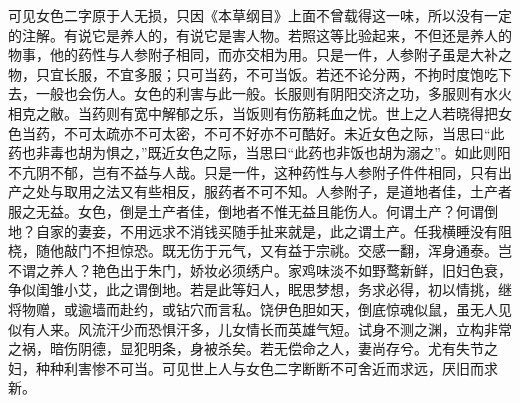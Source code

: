 \documentclass[a4paper,12pt,UTF8,twoside]{ctexbook}
\begin{document}
可见女色二字原于人无损，只因《本草纲目》上面不曾载得这一味，所以没有一定的注解。有说它是养人的，有说它是害人物。若照这等比验起来，不但还是养人的物事，他的药性与人参附子相同，而亦交相为用。只是一件，人参附子虽是大补之物，只宜长服，不宜多服；只可当药，不可当饭。若还不论分两，不拘时度饱吃下去，一般也会伤人。女色的利害与此一般。长服则有阴阳交济之功，多服则有水火相克之敝。当药则有宽中解郁之乐，当饭则有伤筋耗血之忧。世上之人若晓得把女色当药，不可太疏亦不可太密，不可不好亦不可酷好。未近女色之际，当思曰“此药也非毒也胡为惧之，”既近女色之际，当思曰“此药也非饭也胡为溺之”。如此则阳不亢阴不郁，岂有不益与人哉。只是一件，这种药性与人参附子件件相同，只有出产之处与取用之法又有些相反，服药者不可不知。人参附子，是道地者佳，土产者服之无益。女色，倒是土产者佳，倒地者不惟无益且能伤人。何谓土产？何谓倒地？自家的妻妾，不用远求不消钱买随手扯来就是，此之谓土产。任我横睡没有阻桡，随他敲门不担惊恐。既无伤于元气，又有益于宗祧。交感一翻，浑身通泰。岂不谓之养人？艳色出于朱门，娇妆必须绣户。家鸡味淡不如野鹜新鲜，旧妇色衰，争似闺雏小艾，此之谓倒地。若是此等妇人，眠思梦想，务求必得，初以情挑，继将物赠，或逾墙而赴约，或钻穴而言私。饶伊色胆如天，倒底惊魂似鼠，虽无人见似有人来。风流汗少而恐惧汗多，儿女情长而英雄气短。试身不测之渊，立构非常之祸，暗伤阴德，显犯明条，身被杀矣。若无偿命之人，妻尚存兮。尤有失节之妇，种种利害惨不可当。可见世上人与女色二字断断不可舍近而求远，厌旧而求新。
\end{document}
